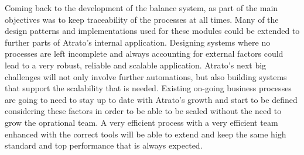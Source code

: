 Coming back to the development of the balance system, as part of the main objectives was to keep traceability of the processes at all times. Many of the design patterns and implementations used for these modules could be extended to further parts of Atrato's internal application. Designing systems where no processes are left incomplete and always accounting for external factors could lead to a very robust, reliable and scalable application. Atrato's next big challenges will not only involve further automations, but also building systems that support the scalability that is needed. Existing on-going business processes are going to need to stay up to date with Atrato's growth and start to be defined considering these factors in order to be able to be scaled without the need to grow the oprational team. A very efficient process with a very efficient team enhanced with the correct tools will be able to extend and keep the same high standard and top performance that is always expected.